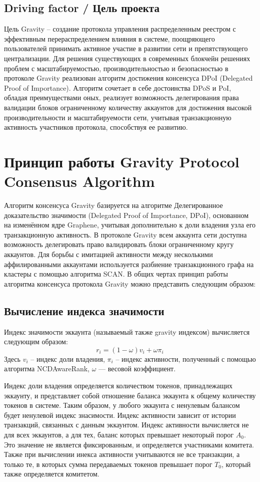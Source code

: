 \documentclass[a4paper,12pt]{article}
\begin{document}
\subsection{Driving factor / Цель проекта}
Цель Gravity – создание протокола управления распределенным реестром с эффективным перераспределением влияния в системе, поощряющего пользователей принимать активное участие в развитии сети и препятствующего централизации. Для решения существующих в современных блокчейн решениях проблем с масштабируемостью, производительностью и безопасностью в протоколе Gravity реализован алгоритм достижения консенсуса DPoI (Delegated Proof of Importance). Алгоритм сочетает в себе достоинства DPoS и PoI, обладая преимуществами оных, реализует возможность делегирования права валидации блоков ограниченному количеству аккаунтов для достижения высокой производительности и масштабируемости сети, учитывая транзакционную активность участников протокола, способствуя ее развитию. 

\section{Принцип работы Gravity Protocol Consensus Algorithm}
Алгоритм консенсуса Gravity базируется на алгоритме Делегированное доказательство значимости (Delegated Proof of Importance, DPoI), основанном на изменённом ядре Graphene, учитывая дополнительно к доли владения узла его транзакционную активность. 
В протоколе Gravity всем аккаунта сети доступна возможность делегировать право валидировать блоки ограниченному кругу аккаунтов.
Для борьбы с имитацией активности между несколькими аффилированными аккаунтами используется разбиение транзакционного графа на кластеры с помощью алгоритма SCAN. В общих чертах принцип работы алгоритма консенсуса протокола Gravity можно представить следующим образом:

\subsection{Вычисление индекса значимости}
Индекс значимости эккаунта (называемый также gravity индексом) вычисляется следующим образом:
$$
r_i = (1 - \omega) v_i + \omega \pi_i
$$
Здесь $v_i$ – индекс доли владения, $\pi_i$ – индекс активности, полученный с помощью алгоритма NCDAwareRank, $\omega$ — весовой коэффициент.

Индекс доли владения определяется количеством токенов, принадлежащих эккаунту, и представляет собой отношение баланса эккаунта к общему количеству токенов в системе. Таким образом, у любого эккаунта с ненулевым балансом будет ненулевой индекс знасимости. Индекс активности зависит от истории транзакций, связанных с данным эккаунтом. Индекс активности вычисляется не для всех эккаунтов, а для тех, баланс которых превышает некоторый порог $A_0$. Это значение не является фиксированным, и определяется участниками комитета. Также при вычислении инекса активности учитываются не все транзакции, а только те, в которых сумма передаваемых токенов превышает порог $T_0$, который также определяется комитетом.
\end{document}
